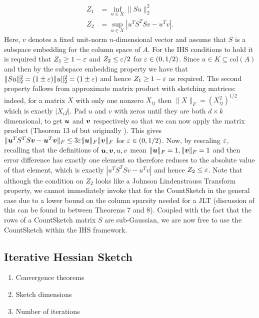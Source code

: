 \begin{align}
  Z_1 &= \inf_{u \in X} \|Su\|_2^2 \\
  Z_2 &= \sup_{u \in X} | u^T S^T S v - u^T v |.
\end{align}
\noindent Here, $v$ denotes a fixed unit-norm $n$-dimensional vector and assume
that $S$ is a subspace embedding for the column space of $A$.
For the IHS conditions to hold it is required that $Z_1 \ge 1-\varepsilon$ and
$Z_2 \le \varepsilon/2$ for $\varepsilon \in (0,1/2)$.
Since $ u \in K \subseteq \text{col}(A)$ and then by the subspace embedding
property we have that $\|Su\|_2^2 = (1 \pm \varepsilon)\|u\|_2^2 = (1 \pm \varepsilon)$ and
hence $Z_1  \ge 1-\varepsilon$ as required.
The second property follows from approximate matrix product with sketching
matrices:
indeed, for a matrix $X$ with only one nonzero $X_{ij}$ then $\|X\|_F = (X_{ij}^2)^{1/2}$
which is exactly $|X_ij|$.
Pad $u$ and $v$ with zeros until they are both $d \times k$ dimensional, to get
$\boldsymbol{u}$ and $\boldsymbol{v}$ respectively so that we can now apply the matrix product
(Theorem 13 of \cite{woodruff2014sketching} but originally \cite{kane2014sparser}).
This gives $\|\boldsymbol{u}^T S^TS \boldsymbol{v} - \boldsymbol{u}^T\boldsymbol{v}\|_F \le 3 \varepsilon \|\boldsymbol{u}\|_F \|\boldsymbol{v}\|_F$
for $\varepsilon \in (0,1/2)$.
Now, by rescaling $\varepsilon$, recalling that the definitions of $\boldsymbol{u},\boldsymbol{v},u,v$
mean $\|\boldsymbol{u}\|_F = 1, \|\boldsymbol{v}\|_F=1$ and then error difference has exactly
one element so therefore reduces to the absolute value of that element, which is
exactly $| u^T S^T S v - u^T v |$ and hence $Z_2 \le \varepsilon$.
Note that although the condition on $Z_2$ looks like a Johnson Lindenstrauss
Transform property, we cannot immediately invoke that for the CountSketch in the
general case due to a lower bound on the column sparsity needed for  a JLT
(discussion of this can be found in \cite{woodruff2014sketching} between Theorems
7 and 8).
Coupled with the fact that the rows of a CountSketch matrix $S$ are sub-Gaussian,
we are now free to use the CountSketch within the IHS framework.

\subsection{Iterative Hessian Sketch}
\begin{enumerate}
  \item{Convergence theorems}
  \item{Sketch dimensions}
  \item{Number of iterations}
\end{enumerate}
